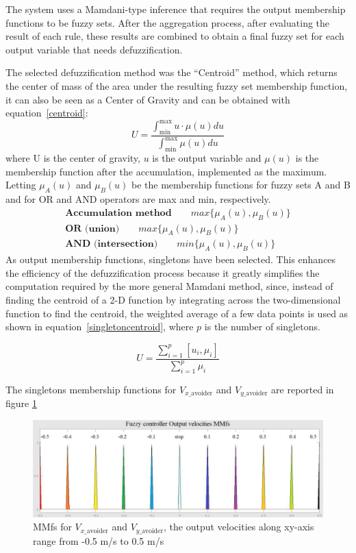 The system uses a Mamdani-type inference that requires the output membership functions to be fuzzy sets. After the aggregation process, \ie after evaluating the result of each rule, these results are combined to obtain a final fuzzy set for each output variable that needs defuzzification.

The selected defuzzification method was the ``Centroid'' method, which returns the center of mass of the area under the resulting fuzzy set membership function, it can also be seen as a Center of Gravity and can be obtained with equation~\ref{centroid}:
\begin{equation}
U=\dfrac{\int_{\text{min}}^{\text{max}} u\cdot\mu(u) du}{\int_{\text{min}}^{\text{max}}\mu(u) du}
\label{centroid}
\end{equation}
where U is the center of gravity, $u$ is the output variable and $\mu(u)$ is the membership function after the accumulation, implemented as the maximum. Letting $\mu_A(u)$ and $\mu_B(u)$ be the membership functions for fuzzy sets A and B and for OR and AND operators are max and min, respectively.
\begin{align}
	\textbf{Accumulation method}\qquad max\lbrace\mu_A(u),\mu_B(u)\rbrace\\
	\textbf{OR (union)}\qquad max\lbrace\mu_A(u),\mu_B(u)\rbrace\\
	\textbf{AND (intersection)}\qquad min\lbrace\mu_A(u),\mu_B(u)\rbrace
\end{align}
As output membership functions, singletons have been selected. This enhances the efficiency of the defuzzification process because it greatly simplifies the computation required by the more general Mamdani method, since, instead of finding the centroid of a 2-D function by integrating across the two-dimensional function to find the centroid, the weighted average of a few data points is used as shown in equation~\ref{singletoncentroid}, where $p$ is the number of singletons.

\begin{equation}
U =	\dfrac{\sum_{i=1}^{p}\left[u_i,\mu_i\right]}{\sum_{i=1}^{p}\mu_i}
\label{singletoncentroid}
\end{equation} 

The singletons membership functions for $V_{x\_ \text{avoider}}$ and $V_{y\_ \text{avoider}}$ are reported in figure \ref{outmmf}

\begin{figure}[h]
	\centering
	\includegraphics[width=\textwidth]{images/03-foundation/outputmmf}
	\caption{MMfs for $V_{x\_ \text{avoider}}$ and $V_{y\_ \text{avoider}}$, the output velocities along xy-axis range from -0.5 m/s to 0.5 m/s}
	\label{outmmf} 
\end{figure}

